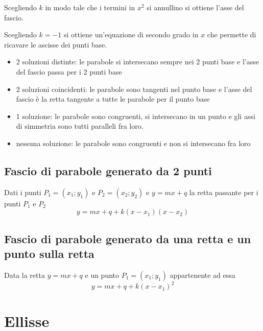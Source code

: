 \documentclass{article}
\begin{document}
  Scegliendo $k$ in modo tale che i termini in $x^2$ si annullino si ottiene l'asse del fascio.

  Scegliendo $k=-1$ si ottiene un'equazione di secondo grado in $x$ che permette di ricavare le ascisse dei punti base. 
  \begin{itemize}
    \item 2 soluzioni distinte: le parabole si intersecano sempre nei 2 punti base e l'asse del fascio passa per i 2 punti base
    \item 2 soluzioni coincidenti: le parabole sono tangenti nel punto base e l'asse del fascio è la retta tangente a tutte le parabole per il punto base
    \item 1 soluzione: le parabole sono congruenti, si intersecano in un punto e gli assi di simmetria sono tutti paralleli fra loro.
    \item nessuna soluzione: le parabole sono congruenti e non si intersecano fra loro
  \end{itemize}

  \subsection*{Fascio di parabole generato da 2 punti}
  Dati i punti $P_1=(x_1; y_1)$ e $P_2=(x_2; y_2)$ e $y=mx+q$ la retta passante per i punti $P_1$ e $P_2$
  \begin{equation}
    y = mx +q +k(x-x_1)(x-x_2)
  \end{equation}

  \subsection*{Fascio di parabole generato da una retta e un punto sulla retta}
  Data la retta $y=mx+q$ e un punto $P_1=(x_1;y_1)$ appartenente ad essa
  \begin{equation}
    y=mx+q + k(x-x_1)^2
  \end{equation}

  \newpage
  \section{Ellisse}
\end{document}
